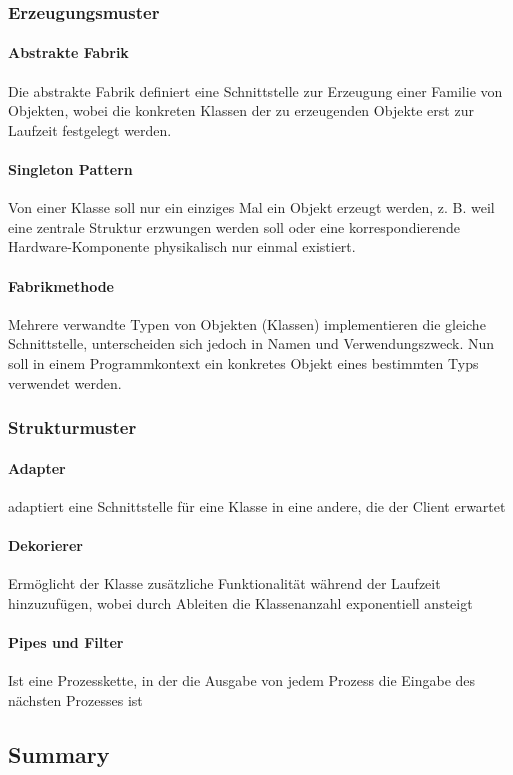 \subsubsection{Erzeugungsmuster}
\paragraph{Abstrakte Fabrik}
Die abstrakte Fabrik definiert eine Schnittstelle zur Erzeugung einer Familie von Objekten, wobei die konkreten Klassen der zu erzeugenden Objekte erst zur Laufzeit festgelegt werden.

\paragraph{Singleton Pattern}
Von einer Klasse soll nur ein einziges Mal ein Objekt erzeugt werden, z. B. weil eine zentrale Struktur erzwungen werden soll oder eine korrespondierende Hardware-Komponente physikalisch nur einmal existiert.

\paragraph{Fabrikmethode}
Mehrere verwandte Typen von Objekten (Klassen) implementieren die gleiche Schnittstelle, unterscheiden sich jedoch in Namen und Verwendungszweck. Nun soll in einem Programmkontext ein konkretes Objekt eines bestimmten Typs verwendet werden.

\subsubsection{Strukturmuster}
\paragraph{Adapter}
adaptiert eine Schnittstelle für eine Klasse in eine andere, die der Client erwartet

\paragraph{Dekorierer}
Ermöglicht der Klasse zusätzliche Funktionalität während der Laufzeit hinzuzufügen, wobei durch Ableiten die Klassenanzahl exponentiell ansteigt

\paragraph{Pipes und Filter}
Ist eine Prozesskette, in der die Ausgabe von jedem Prozess die Eingabe des nächsten Prozesses ist


\subsection{Summary}
